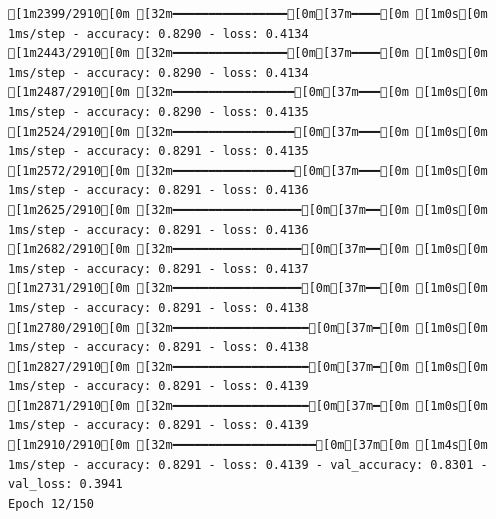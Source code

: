 \documentclass[
  letterpaper,
  DIV=11,
  numbers=noendperiod]{scrartcl}
\begin{document}
\begin{verbatim}
[1m2399/2910[0m [32m━━━━━━━━━━━━━━━━[0m[37m━━━━[0m [1m0s[0m 1ms/step - accuracy: 0.8290 - loss: 0.4134
[1m2443/2910[0m [32m━━━━━━━━━━━━━━━━[0m[37m━━━━[0m [1m0s[0m 1ms/step - accuracy: 0.8290 - loss: 0.4134
[1m2487/2910[0m [32m━━━━━━━━━━━━━━━━━[0m[37m━━━[0m [1m0s[0m 1ms/step - accuracy: 0.8290 - loss: 0.4135
[1m2524/2910[0m [32m━━━━━━━━━━━━━━━━━[0m[37m━━━[0m [1m0s[0m 1ms/step - accuracy: 0.8291 - loss: 0.4135
[1m2572/2910[0m [32m━━━━━━━━━━━━━━━━━[0m[37m━━━[0m [1m0s[0m 1ms/step - accuracy: 0.8291 - loss: 0.4136
[1m2625/2910[0m [32m━━━━━━━━━━━━━━━━━━[0m[37m━━[0m [1m0s[0m 1ms/step - accuracy: 0.8291 - loss: 0.4136
[1m2682/2910[0m [32m━━━━━━━━━━━━━━━━━━[0m[37m━━[0m [1m0s[0m 1ms/step - accuracy: 0.8291 - loss: 0.4137
[1m2731/2910[0m [32m━━━━━━━━━━━━━━━━━━[0m[37m━━[0m [1m0s[0m 1ms/step - accuracy: 0.8291 - loss: 0.4138
[1m2780/2910[0m [32m━━━━━━━━━━━━━━━━━━━[0m[37m━[0m [1m0s[0m 1ms/step - accuracy: 0.8291 - loss: 0.4138
[1m2827/2910[0m [32m━━━━━━━━━━━━━━━━━━━[0m[37m━[0m [1m0s[0m 1ms/step - accuracy: 0.8291 - loss: 0.4139
[1m2871/2910[0m [32m━━━━━━━━━━━━━━━━━━━[0m[37m━[0m [1m0s[0m 1ms/step - accuracy: 0.8291 - loss: 0.4139
[1m2910/2910[0m [32m━━━━━━━━━━━━━━━━━━━━[0m[37m[0m [1m4s[0m 1ms/step - accuracy: 0.8291 - loss: 0.4139 - val_accuracy: 0.8301 - val_loss: 0.3941
Epoch 12/150


\end{verbatim}
\end{document}
